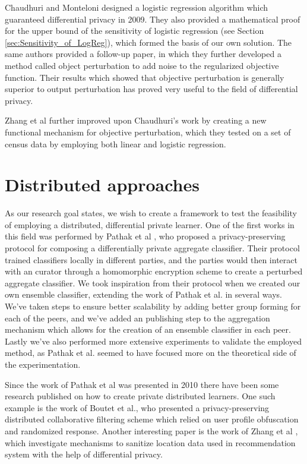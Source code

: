 
Chaudhuri and Monteloni designed a logistic regression algorithm which guaranteed differential privacy in 2009. They also provided a mathematical proof for the upper bound of the sensitivity of logistic regression (see Section \ref{sec:Sensitivity_of_LogReg}), which formed the basis of our own solution. The same authors provided a follow-up paper\citep{chaudhuri2011riskMinimization}, in which they further developed a method called object perturbation to add noise to the regularized objective function. Their results which showed that objective perturbation is generally superior to output perturbation has proved very useful to the field of differential privacy. 

Zhang et al \citep{zhang2012functionMechanism} further improved upon Chaudhuri's work by creating a new functional mechanism for objective perturbation, which they tested on a set of census data by employing both linear and logistic regression. 

\section{Distributed approaches}
As our research goal states, we wish to create a framework to test the feasibility of employing a distributed, differential private learner. One of the first works in this field was performed by Pathak et al  \citep{pathak2010diffprivhomo}, who proposed a privacy-preserving protocol for composing a differentially private aggregate classifier. Their protocol trained classifiers locally in different parties, and the parties would then interact with an curator through a homomorphic encryption scheme to create a perturbed aggregate classifier. We took inspiration from their protocol when we created our own ensemble classifier, extending the work of Pathak et al. in several ways. We've taken steps to ensure better scalability by adding better group forming for each of the peers, and we've added an publishing step to the aggregation mechanism which allows for the creation of an ensemble classifier in each peer. Lastly we've also performed more extensive experiments to validate the employed method, as Pathak et al. seemed to have focused more on the theoretical side of the experimentation. 

Since the work of Pathak et al was presented in 2010 there have been some research published on how to create private distributed learners. One such example is the work of Boutet et al.\citep{boutet2013DisCollFil}, who presented a privacy-preserving distributed collaborative filtering scheme which relied on user profile obfuscation and randomized response. Another interesting paper is the work of Zhang et al \citep{zhang2014locationRecommendation}, which investigate mechanisms to sanitize location data used in recommendation system with the help of differential privacy. 

